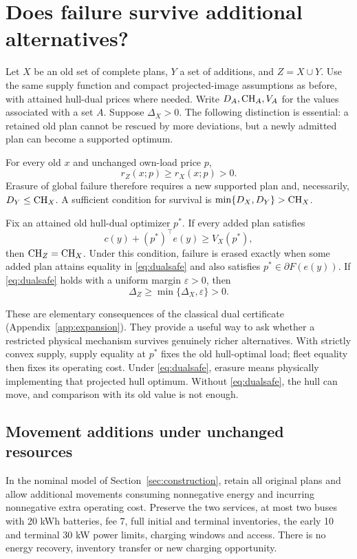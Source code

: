 \section{Does failure survive additional alternatives?}\label{sec:expansion}
Let $X$ be an old set of complete plans, $Y$ a set of additions, and
$Z=X\cup Y$. Use the same supply function and compact projected-image
assumptions as before, with attained hull-dual prices where needed. Write
$D_A,\mathrm{CH}_A,V_A$ for the values associated with a set $A$. Suppose
$\Delta_X>0$. The following distinction is essential: a retained old plan
cannot be rescued by more deviations, but a newly admitted plan can become
a supported optimum.

\begin{proposition}\label{prop:expansion}
For every old $x$ and unchanged own-load price $p$,
\[
 r_Z(x;p)\ge r_X(x;p)>0.
\]
Erasure of global failure therefore requires a new supported plan and,
necessarily, $D_Y\le\mathrm{CH}_X$. A sufficient condition for survival is
$\min\{D_X,D_Y\}>\mathrm{CH}_X$.

Fix an attained old hull-dual optimizer $p^*$. If every added plan satisfies
\begin{equation}\label{eq:dualsafe}
 c(y)+(p^*)^\top e(y)\ge V_X(p^*),
\end{equation}
then $\mathrm{CH}_Z=\mathrm{CH}_X$. Under this condition, failure is erased exactly when
some added plan attains equality in \eqref{eq:dualsafe} and also satisfies
$p^*\in\partial F(e(y))$. If \eqref{eq:dualsafe} holds with a uniform
margin $\varepsilon>0$, then
\[
 \Delta_Z\ge\min\{\Delta_X,\varepsilon\}>0.
\]
\end{proposition}

These are elementary consequences of the classical dual certificate
(Appendix~\ref{app:expansion}). They provide a useful way to ask whether
a restricted physical mechanism survives genuinely richer alternatives.
With strictly convex supply, supply equality at $p^*$ fixes the old
hull-optimal load; fleet equality then fixes its operating cost. Under
\eqref{eq:dualsafe}, erasure means physically implementing that projected
hull optimum. Without \eqref{eq:dualsafe}, the hull can move, and comparison
with its old value is not enough.

\subsection{Movement additions under unchanged resources}
In the nominal model of Section~\ref{sec:construction}, retain all original
plans and allow additional movements consuming nonnegative energy and
incurring nonnegative extra operating cost. Preserve the two services,
at most two buses with 20 kWh batteries, fee 7, full initial and terminal
inventories, the early 10 and terminal 30 kW power limits, charging windows and access.
There is no energy recovery, inventory transfer or new charging opportunity.

